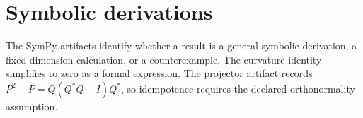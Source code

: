 \section{Symbolic derivations}

The SymPy artifacts identify whether a result is a general symbolic derivation, a fixed-dimension calculation, or a counterexample. The curvature identity simplifies to zero as a formal expression. The projector artifact records $P^2-P=Q(Q^*Q-I)Q^*$, so idempotence requires the declared orthonormality assumption.

